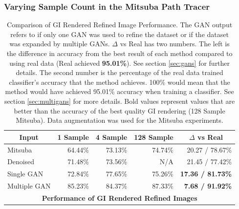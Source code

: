 \documentclass[10pt,twocolumn,letterpaper]{article}
\begin{document}
\subsubsection{Varying Sample Count in the Mitsuba Path Tracer}
\begin{table}[]
\centering
\begin{tabular}{|l|r|r|r|r|}
\hline
\multicolumn{1}{|c|}{\textbf{Input}}
& \multicolumn{1}{c|}{\textbf{1 Sample}}
& \multicolumn{1}{c|}{\textbf{4 Sample}}
& \multicolumn{1}{c|}{\textbf{128 Sample}}
& \multicolumn{1}{c|}{\textbf{$\Delta$ vs Real}} \\ \hline
Mitsuba		& 64.44\%	& 73.13\%	& 74.74\%	& 20.27 / 78.67\% \\
Denoised	& 71.48\%	& 73.56\%	& N/A 		& 21.45 / 77.42\%	\\
Single GAN	& 72.84\%	& 77.65\% 	& 75.26\%	& \textbf{17.36 / 81.73\%}	\\
Multiple GAN& 85.23\%	& 84.37\% 	& 87.33\% 	& \textbf{7.68 / 91.92\%}		\\ \hline
\multicolumn{5}{|c|}{\textbf{Performance of GI Rendered Refined Images}}	\\ \hline
\end{tabular}
\caption{Comparison of GI Rendered Refined Image Performance. The GAN output refers to if only one GAN was used to refine the dataset or if the dataset was expanded by multiple GANs. $\Delta$ vs Real has two numbers. The left is the difference in accuracy from the best result of each method compared to using real data (Real achieved \textbf{95.01\%}). See section \ref{sec:gans} for further details.  The second number is the percentage of the real data trained classifier's accuracy that the method achieves.  100\% would mean that the method would have achieved 95.01\% accuracy when training a classifier. See section \ref{sec:multigans} for more details. Bold values represent values that are better than the accuracy of the best quality GI rendering (128 Sample Mitsuba). Data augmentation was used for the Mitsuba experiments. }
\label{tblallrefined}
\end{table}
\end{document}

